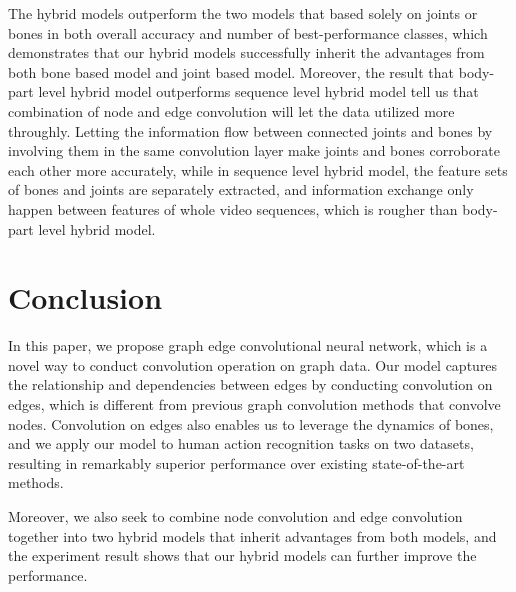 \documentclass[a4paper,11pt]{article}
\begin{document}
The hybrid models outperform the two models that based solely on joints or bones in both overall accuracy and number of best-performance classes, which demonstrates that our hybrid models successfully inherit the advantages from both bone based model and joint based model. 
Moreover, the result that body-part level hybrid model outperforms sequence level hybrid model tell us that combination of node and edge convolution will let the data utilized more throughly. Letting the information flow between connected joints and bones by involving them in the same convolution layer make joints and bones corroborate each other more accurately, while in sequence level hybrid model, the feature sets of bones and joints are separately extracted, and information exchange only happen between features of whole video sequences, which is rougher than body-part level hybrid model.



\section{Conclusion}
In this paper, we propose graph edge convolutional neural network, which is a novel way to conduct convolution operation on graph data. Our model captures the relationship and dependencies between edges by conducting convolution on edges, which is different from previous graph convolution methods that convolve nodes. Convolution on edges also enables us to leverage the dynamics of bones, and we apply our model to human action recognition tasks on two datasets, resulting in remarkably superior performance over existing state-of-the-art methods. 

Moreover, we also seek to combine node convolution and edge convolution together into two hybrid models that inherit advantages from both models, and the experiment result shows that our hybrid models can further improve the performance.






\end{document}

